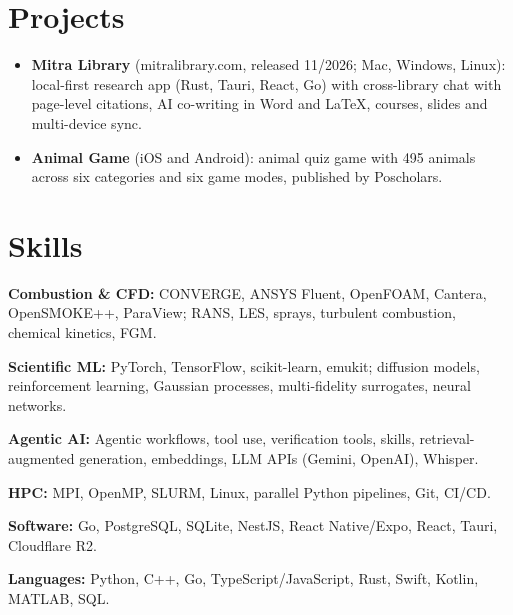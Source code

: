 \documentclass[letterpaper,10pt]{article}
\begin{document}
\section{Projects}
\begin{itemize}
  \item \textbf{Mitra Library} (mitralibrary.com, released 11/2026; Mac, Windows, Linux): local-first research app (Rust, Tauri, React, Go)
        with cross-library chat with page-level citations, AI co-writing in Word and LaTeX, courses, slides and multi-device sync.
  \item \textbf{Animal Game} (iOS and Android): animal quiz game with 495 animals across six categories and six game modes,
        published by Poscholars.
\end{itemize}

\section{Skills}
\textbf{Combustion \& CFD:} CONVERGE, ANSYS Fluent, OpenFOAM, Cantera, OpenSMOKE++, ParaView; RANS, LES, sprays, turbulent combustion, chemical kinetics, FGM.\par
\textbf{Scientific ML:} PyTorch, TensorFlow, scikit-learn, emukit; diffusion models, reinforcement learning, Gaussian processes, multi-fidelity surrogates, neural networks.\par
\textbf{Agentic AI:} Agentic workflows, tool use, verification tools, skills, retrieval-augmented generation, embeddings, LLM APIs (Gemini, OpenAI), Whisper.\par
\textbf{HPC:} MPI, OpenMP, SLURM, Linux, parallel Python pipelines, Git, CI/CD.\par
\textbf{Software:} Go, PostgreSQL, SQLite, NestJS, React Native/Expo, React, Tauri, Cloudflare R2.\par
\textbf{Languages:} Python, C++, Go, TypeScript/JavaScript, Rust, Swift, Kotlin, MATLAB, SQL.\par

\end{document}
